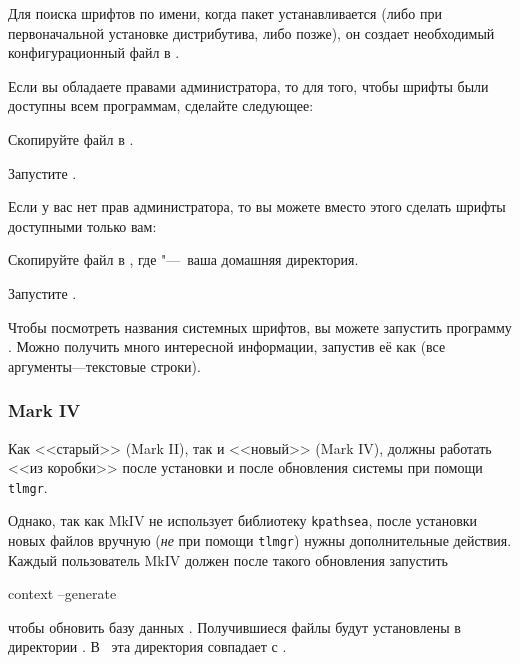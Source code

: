 \documentclass{article}
\begin{document}
Для поиска шрифтов по имени, когда пакет 
устанавливается (либо при первоначальной установке дистрибутива, либо
позже), он создает необходимый конфигурационный файл в
.

Если вы обладаете правами администратора, то для того, чтобы шрифты
\TL{} были доступны всем программам, сделайте следующее:
\begin{enumerate*}
\item Скопируйте файл  в
.
\item Запустите .
\end{enumerate*}

Если у вас нет прав администратора, то вы можете вместо этого сделать
шрифты \TL{} доступными только вам:
\begin{enumerate*}
\item Скопируйте файл  в
      , где \filename{~} "---~ваша домашняя
      директория. 
\item Запустите .
\end{enumerate*}

Чтобы посмотреть названия системных шрифтов, вы можете запустить
программу .  Можно получить много интересной информации,
запустив её как  (все
аргументы---текстовые строки).  

\subsubsection{\protect\ConTeXt{} Mark IV}
\label{sec:context-mkiv}

Как <<старый>> \ConTeXt{}(Mark II), так и <<новый>> \ConTeXt{}
(Mark IV), должны работать <<из коробки>> после установки \TL{}
и после обновления системы при помощи \verb+tlmgr+.  

Однако, так как \ConTeXt{} MkIV не использует библиотеку
\verb+kpathsea+, после установки новых файлов вручную (\emph{не} при
помощи \verb+tlmgr+) нужны дополнительные действия.  Каждый
пользователь MkIV должен после такого обновления запустить 
\begin{sverbatim}
context --generate
\end{sverbatim}
чтобы обновить базу данных \ConTeXt{}.  Получившиеся файлы будут
установлены в директории .  В \TL\ эта директория
совпадает с .
\end{document}
